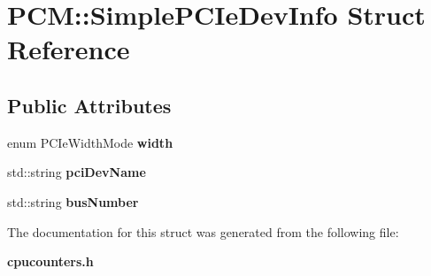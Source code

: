 \section{P\+CM\+:\+:Simple\+P\+C\+Ie\+Dev\+Info Struct Reference}
\label{structPCM_1_1SimplePCIeDevInfo}
\subsection*{Public Attributes}
\begin{DoxyCompactItemize}
\item 
\mbox{\label{structPCM_1_1SimplePCIeDevInfo_aa0e968e867b25f2768660045e732fa99}} 
enum P\+C\+Ie\+Width\+Mode {\bfseries width}
\item 
\mbox{\label{structPCM_1_1SimplePCIeDevInfo_a4722c35d989dbf2d336d598ee1319a18}} 
std\+::string {\bfseries pci\+Dev\+Name}
\item 
\mbox{\label{structPCM_1_1SimplePCIeDevInfo_a7f715c7d0e27d8818e45959c7f784544}} 
std\+::string {\bfseries bus\+Number}
\end{DoxyCompactItemize}


The documentation for this struct was generated from the following file\+:\begin{DoxyCompactItemize}
\item 
\textbf{ cpucounters.\+h}\end{DoxyCompactItemize}
